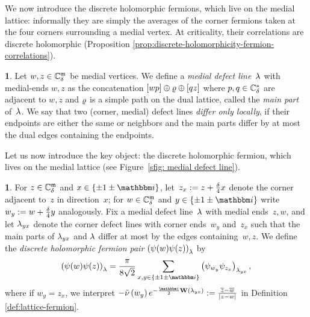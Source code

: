 \documentclass[12pt,oneside,english]{amsart}
\numberwithin{equation}{section}
\numberwithin{figure}{section}
\theoremstyle{plain}
\theoremstyle{plain}
\theoremstyle{plain}
\theoremstyle{plain}
\theoremstyle{remark}
\theoremstyle{definition}
\newtheorem{defn}[thm]{\protect\definitionname}
\theoremstyle{plain}
\theoremstyle{plain}
\numberwithin{thm}{section}
\providecommand{\definitionname}{Definition}
\providecommand{\definitionname}{Definition}
\providecommand{\definitionname}{Definition}
\providecommand{\definitionname}{Definition}
\begin{document}
We now introduce the discrete holomorphic fermions, which live on
the medial lattice: informally they are simply the averages of the
corner fermions taken at the four corners surrounding a medial vertex.
At criticality, their correlations are discrete holomorphic (Proposition
\ref{prop:discrete-holomorphicity-fermion-correlations}). 
\begin{defn}\label{def:medial-defect-line}
Let $w,z\in{\mathbb{C}_{{\delta}}^{\mathfrak{m}}}$ be medial vertices. We define a \emph{medial
defect line}~${\lambda}$ with medial-ends $w,z$ as the concatenation
$\left[wp\right]\oplus{\varrho}\oplus\left[qz\right]$ where $p,q \in {\mathbb{C}_{{\delta}}^*}$
are adjacent to $w,z$ and ${\varrho}$ is a simple path on the dual
lattice, %
called the \emph{main part} of~${\lambda}$. We say that two (corner, medial) 
defect lines %
\emph{differ only locally}, if their endpoints are either the
same or neighbors and the main parts differ by at most the dual edges
containing the endpoints. 
\end{defn}

Let us now introduce the key object: the discrete holomorphic fermion,
which lives on the medial lattice (see Figure~\ref{sfig: medial defect line}).


\begin{defn}\label{def:lattice-holomorphic-fermion}
For $z \in {\mathbb{C}_{{\delta}}^{\mathfrak{m}}}$ and $x \in \set {\pm1\pm \ii}$, 
let~$z_{x} := z + \frac{{\delta}}{4} x$ denote the 
corner adjacent to~$z$ in direction~$x$;
for $w \in {\mathbb{C}_{{\delta}}^{\mathfrak{m}}}$ and $y \in \set {\pm1\pm \ii}$ write 
$w_{y} := w+ \frac{{\delta}}{4} y$ analogously.
Fix a medial defect line~${\lambda}$ with medial ends~$z,w$, and let
${\lambda}_{yx}$ denote the corner defect lines with corner ends~$w_{y}$
and~$z_{x}$ such that 
the main parts of ${\lambda}_{yx}$ and ${\lambda}$
differ at most by the edges containing~$w,z$.
We define the \emph{discrete holomorphic fermion pair} 
$\left( {\psi}(w)  {\psi}(z)  \right)_{{\lambda}}$
by 
\[
\left(\ferm(w)  \ferm(z) \right)_{\mdldefline}
= \frac{\pi}{8\sqrt{2}} \sum_{x,y \in \set{\pm1 \pm \ii}}
  \left(\ferm_{w_{y}} \ferm_{z_{x}}\right)_{\cordefline_{yx}},
\]
where if $w_{y}=z_{x}$, we interpret
$-\bar{\corndir}\left(w_{y}\right)
e^{-\frac{\ii}{2}\mathbf{W}\left(\cordefline_{yx}\right)}
:= \frac{\overline{z}-\overline{w}}{|z-w|}$
in Definition \ref{def:lattice-fermion}. 
\end{defn}
\end{document}
